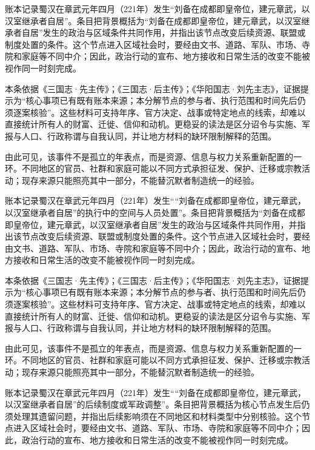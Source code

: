 账本记录蜀汉在章武元年四月（221年）发生“刘备在成都即皇帝位，建元章武，以汉室继承者自居”。条目把背景概括为“刘备在成都即皇帝位，建元章武，以汉室继承者自居”发生的政治与区域条件共同作用，并指出该节点改变后续资源、联盟或制度处置的条件。这个节点进入区域社会时，要经由文书、道路、军队、市场、寺院和家庭等不同中介；因此，政治行动的宣布、地方接收和日常生活的改变不能被视作同一时刻完成。

本条依据《三国志·先主传》；《三国志·后主传》；《华阳国志·刘先主志》，证据提示为“核心事项已有既有账本来源；本分解节点的参与者、执行范围和时间先后仍须逐案核验”。这些材料可支持年序、官方决定、战事或特定地点的线索，却难以直接统计所有人的财富、迁徙、信仰和动机。更稳妥的读法是区分诏令与实施、军报与人口、行政称谓与自我认同，并让地方材料的缺环限制解释的范围。

由此可见，该事件不是孤立的年表点，而是资源、信息与权力关系重新配置的一环。不同地区的官员、社群和家庭可能以不同方式承担征发、保护、迁移或宗教活动；现存来源只能照亮其中一部分，不能替沉默者制造统一的经验。

账本记录蜀汉在章武元年四月（221年）发生““刘备在成都即皇帝位，建元章武，以汉室继承者自居”的执行中的空间与人员处置”。条目把背景概括为“刘备在成都即皇帝位，建元章武，以汉室继承者自居”发生的政治与区域条件共同作用，并指出该节点改变后续资源、联盟或制度处置的条件。这个节点进入区域社会时，要经由文书、道路、军队、市场、寺院和家庭等不同中介；因此，政治行动的宣布、地方接收和日常生活的改变不能被视作同一时刻完成。

本条依据《三国志·先主传》；《三国志·后主传》；《华阳国志·刘先主志》，证据提示为“核心事项已有既有账本来源；本分解节点的参与者、执行范围和时间先后仍须逐案核验”。这些材料可支持年序、官方决定、战事或特定地点的线索，却难以直接统计所有人的财富、迁徙、信仰和动机。更稳妥的读法是区分诏令与实施、军报与人口、行政称谓与自我认同，并让地方材料的缺环限制解释的范围。

由此可见，该事件不是孤立的年表点，而是资源、信息与权力关系重新配置的一环。不同地区的官员、社群和家庭可能以不同方式承担征发、保护、迁移或宗教活动；现存来源只能照亮其中一部分，不能替沉默者制造统一的经验。

账本记录蜀汉在章武元年四月（221年）发生““刘备在成都即皇帝位，建元章武，以汉室继承者自居”的后续制度或军政调整”。条目把背景概括为核心节点发生后仍须处理其遗留问题，并指出后续影响须在不同地区和材料类型中分别核验。这个节点进入区域社会时，要经由文书、道路、军队、市场、寺院和家庭等不同中介；因此，政治行动的宣布、地方接收和日常生活的改变不能被视作同一时刻完成。

